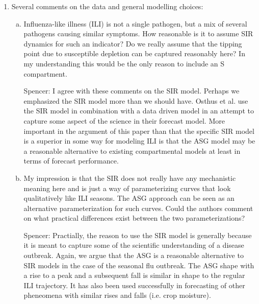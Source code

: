 \documentclass{article}
\newcommand{\spencer}[1]{{\color{blue} Spencer: #1}}
\begin{document}
\begin{enumerate}[1.]
\begin{enumerate}[a.]
\spencer{Without assuming a value for the $\lambda$ parameter in the ASG model, there were
serious problems with parameter identifiability. 
Osthus et al. in their SIR model doe something similar by setting $S_0 = 0.9$}

\item Notably it would be helpful to comment on how this approach affects the uncertainty
propagation / overall quantification of forecast uncertainty.

\end{enumerate}


\item Several comments on the data and general modelling choices:

\begin{enumerate}[a.]
\item Influenza-like illness (ILI) is not a single pathogen, but a mix of several pathogens causing
similar symptoms. How reasonable is it to assume SIR dynamics for such an indicator? Do we
really assume that the tipping point due to susceptible depletion can be captured reasonably here? In
my understanding this would be the only reason to include an S compartment.

\spencer{I agree with these comments on the SIR model. Perhaps we emphasized the SIR model more than we 
should have. Osthus et al. use the SIR model in combination with a data driven model
in an attempt to capture some aspect of the science in their forecast model.
More important in the argument of this paper than that the specific SIR model is
a superior in some way for modeling ILI is that the ASG model may
be a reasonable alternative to existing compartmental models at least in terms
of forecast performance.}

\item My impression is that the SIR does not really have any mechanistic meaning here and is just a
way of parameterizing curves that look qualitatively like ILI seasons. The ASG approach can be
seen as an alternative parameterization for such curves. Could the authors comment on what
practical differences exist between the two parameterizations?

\spencer{Practially, the reason to use the SIR model is generally because it is meant
to capture some of the scientific understanding of a disease outbreak. Again, we argue 
that the ASG is a reasonable alternative to SIR models in the case of the seasonal flu
outbreak. The ASG shape with a rise to a peak and a subsequent fall is similar in shape
to the regular ILI trajectory. It has also been used successfully in forecasting of 
other pheneomena with similar rises and falls (i.e. crop moisture)}.




\end{enumerate}
\end{enumerate}
\end{document}
